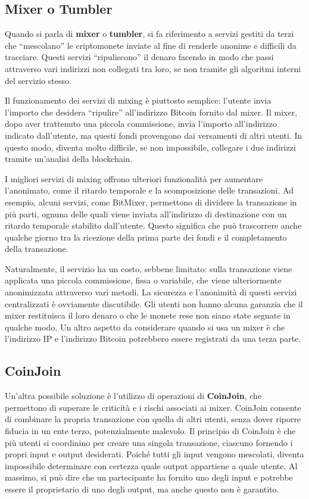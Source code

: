 \subsection{Mixer o Tumbler}
Quando si parla di \textbf{mixer} o \textbf{tumbler}, si fa riferimento a servizi gestiti da terzi che “mescolano” le criptomonete inviate al fine di renderle anonime e difficili da tracciare. Questi servizi “ripuliscono” il denaro facendo in modo che passi attraverso vari indirizzi non collegati tra loro, se non tramite gli algoritmi interni del servizio stesso.

Il funzionamento dei servizi di mixing è piuttosto semplice: l'utente invia l'importo che desidera “ripulire” all'indirizzo Bitcoin fornito dal mixer. Il mixer, dopo aver trattenuto una piccola commissione, invia l'importo all'indirizzo indicato dall'utente, ma questi fondi provengono dai versamenti di altri utenti. In questo modo, diventa molto difficile, se non impossibile, collegare i due indirizzi tramite un'analisi della blockchain.

I migliori servizi di mixing offrono ulteriori funzionalità per aumentare l'anonimato, come il ritardo temporale e la scomposizione delle transazioni. Ad esempio, alcuni servizi, come BitMixer, permettono di dividere la transazione in più parti, ognuna delle quali viene inviata all'indirizzo di destinazione con un ritardo temporale stabilito dall'utente. Questo significa che può trascorrere anche qualche giorno tra la ricezione della prima parte dei fondi e il completamento della transazione.

Naturalmente, il servizio ha un costo, sebbene limitato: sulla transazione viene applicata una piccola commissione, fissa o variabile, che viene ulteriormente anonimizzata attraverso vari metodi. La sicurezza e l'anonimità di questi servizi centralizzati è ovviamente discutibile. Gli utenti non hanno alcuna garanzia che il mixer restituisca il loro denaro o che le monete rese non siano state segnate in qualche modo. Un altro aspetto da considerare quando si usa un mixer è che l'indirizzo IP e l'indirizzo Bitcoin potrebbero essere registrati da una terza parte.

\subsection{CoinJoin}
Un'altra possibile soluzione è l'utilizzo di operazioni di \textbf{CoinJoin}, che permettono di superare le criticità e i rischi associati ai mixer. CoinJoin consente di combinare la propria transazione con quella di altri utenti, senza dover riporre fiducia in un ente terzo, potenzialmente malevolo. Il principio di CoinJoin è che più utenti si coordinino per creare una singola transazione, ciascuno fornendo i propri input e output desiderati. Poiché tutti gli input vengono mescolati, diventa impossibile determinare con certezza quale output appartiene a quale utente. Al massimo, si può dire che un partecipante ha fornito uno degli input e potrebbe essere il proprietario di uno degli output, ma anche questo non è garantito.

